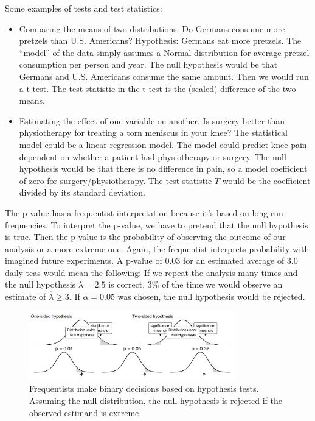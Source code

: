 \documentclass[
  10pt,
]{scrbook}
\providecommand{\tightlist}{%
  \setlength{\itemsep}{0pt}\setlength{\parskip}{0pt}}
\begin{document}
Some examples of tests and test statistics:

\begin{itemize}
\tightlist
\item
  Comparing the means of two distributions. Do Germans consume more pretzels than U.S. Americans? Hypothesis: Germans eat more pretzels. The ``model'' of the data simply assumes a Normal distribution for average pretzel consumption per person and year. The null hypothesis would be that Germans and U.S. Americans consume the same amount. Then we would run a t-test. The test statistic in the t-test is the (scaled) difference of the two means.
\item
  Estimating the effect of one variable on another. Is surgery better than physiotherapy for treating a torn meniscus in your knee? The statistical model could be a linear regression model. The model could predict knee pain dependent on whether a patient had physiotherapy or surgery. The null hypothesis would be that there is no difference in pain, so a model coefficient of zero for surgery/physiotherapy. The test statistic \(T\) would be the coefficient divided by its standard deviation.
\end{itemize}

The p-value has a frequentist interpretation because it's based on long-run frequencies.
To interpret the p-value, we have to pretend that the null hypothesis is true.
Then the p-value is the probability of observing the outcome of our analysis or a more extreme one.
Again, the frequentist interprets probability with imagined future experiments.
A p-value of 0.03 for an estimated average of 3.0 daily teas would mean the following:
If we repeat the analysis many times and the null hypothesis \(\lambda = 2.5\) is correct, 3\% of the time we would observe an estimate of \(\hat{\lambda} \geq 3\).
If \(\alpha = 0.05\) was chosen, the null hypothesis would be rejected.

\begin{figure}

{\centering \includegraphics[width=0.8\textwidth]{figures/hypothesis-1} 

}

\caption{Frequentists make binary decisions based on hypothesis tests. Assuming the null distribution, the null hypothesis is rejected if the observed estimand is extreme.}\label{fig:hypothesis}
\end{figure}
\end{document}
